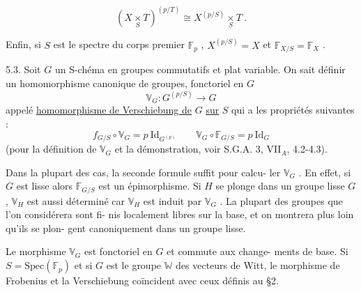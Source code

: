 \[ (X \underset{S}{\times} T)^{(p/T)} \cong X^{(p/S)} \underset{S}{\times} T \ . \]

Enfin, si $S$ est le spectre du corps premier $\mathbb{F}_p$ , $X^{(p/S)} = X$ et
$\mathbb{F}_{X/S} = \mathbb{F}_X$ .

5.3. \quad Soit $G$ un S-chéma en groupes commutatifs et plat variable.
On sait définir un homomorphisme canonique de groupes, fonctoriel en $G$
\[ \mathbb{V}_G : G^{(p/S)} \to G \]
appelé \uline{homomorphisme de Verschiebung de} $G$ \uline{sur} $S$ qui a les propriétés
suivantes :
\[ \boxed{ f_{G/S} \circ \mathbb{V}_G = p \ \mathrm{Id}_{G^{(p)}} \qquad \mathbb{V}_G \circ \mathbb{F}_{G/S} = p \ \mathrm{Id}_G } \]
(pour la définition de $\mathbb{V}_G$ et la démonstration, voir S.G.A. 3, VII$_A$,
4.2-4.3).

Dans la plupart des cas, la seconde formule suffit pour calcu-%
ler $\mathbb{V}_G$ . En effet, si $G$ est lisse alors $\mathbb{F}_{G/S}$ est un épimorphisme. Si
$H$ se plonge dans un groupe lisse $G$ , $\mathbb{V}_H$ est aussi déterminé car $\mathbb{V}_H$
est induit par $\mathbb{V}_G$ . La plupart des groupes que l'on considérera sont fi-%
nis localement libres sur la base, et on montrera plus loin qu'ils se plon-%
gent canoniquement dans un groupe lisse.

Le morphisme $\mathbb{V}_G$ est fonctoriel en $G$ et commute aux change-%
ments de base. Si $S = \mathrm{Spec}(\mathbb{F}_p)$ et si $G$ est le groupe $\mathbb{W}$ des vecteurs
de Witt, le morphisme de Frobenius et la Verschiebung coïncident avec ceux
définis au §2.


